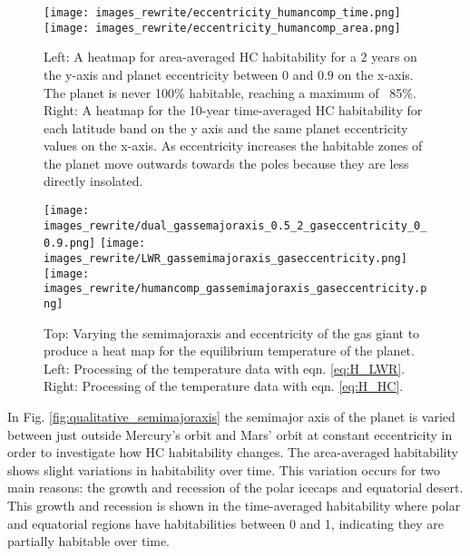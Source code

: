 \documentclass[12pt, onecolumn]{revtex4-2}    %
\begin{document}
\begin{figure}[t]
  \texttt{[image: images\_rewrite/eccentricity\_humancomp\_time.png]}
  \texttt{[image: images\_rewrite/eccentricity\_humancomp\_area.png]}
  \caption{
    Left: A heatmap for area-averaged HC habitability for a 2 years on the y-axis and planet eccentricity between $0$ and $0.9$ on the x-axis.
    The planet is never 100\% habitable, reaching a maximum of ~85\%.
    Right: A heatmap for the 10-year time-averaged HC habitability for each latitude band on the y axis and the same planet eccentricity values on the x-axis.
    As eccentricity increases the habitable zones of the planet move outwards towards the poles because they are less directly insolated.
  }
  \label{fig:qualitative_eccentricity}
\end{figure}

\begin{figure}[t]
  \texttt{[image: images\_rewrite/dual\_gassemajoraxis\_0.5\_2\_gaseccentricity\_0\_0.9.png]}
  \texttt{[image: images\_rewrite/LWR\_gassemimajoraxis\_gaseccentricity.png]}
  \texttt{[image: images\_rewrite/humancomp\_gassemimajoraxis\_gaseccentricity.png]}
  \caption{
    Top: Varying the semimajoraxis and eccentricity of the gas giant to produce a heat map for the equilibrium temperature of the planet.
    Left: Processing of the temperature data with eqn. \eqref{eq:H_LWR}.
    Right: Processing of the temperature data with eqn. \eqref{eq:H_HC}.
  }
  \label{fig:qualitative_semimajoraxis_eccentricity}
\end{figure}

In Fig. \ref{fig:qualitative_semimajoraxis} the semimajor axis of the planet is varied between just outside Mercury's orbit and Mars' orbit at constant eccentricity in order to investigate how HC habitability changes.
The area-averaged habitability shows slight variations in habitability over time.
This variation occurs for two main reasons: the growth and recession of the polar icecaps and equatorial desert.
This growth and recession is shown in the time-averaged habitability where polar and equatorial regions have habitabilities between 0 and 1, indicating they are partially habitable over time.
\end{document}
